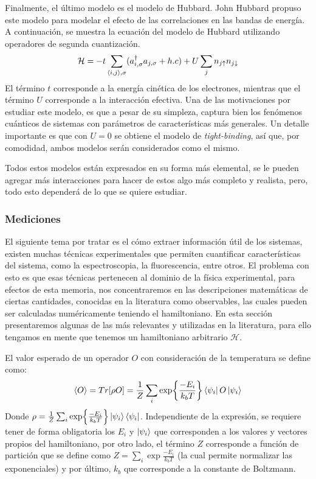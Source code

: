 Finalmente, el último modelo es el modelo de Hubbard\cite{HubbardModel}. John Hubbard propuso este modelo para modelar el efecto de las correlaciones en las bandas de energía. A continuación, se muestra la ecuación del modelo de Hubbard utilizando operadores de segunda cuantización.
\begin{equation}
    \mathcal{H} = -t \sum_{\expval{i,j}, \sigma}( a^{\dag}_{i, \sigma} a_{j, \sigma} + h.c) + U\sum_{j}n_{j\uparrow}n_{j\downarrow}
    \label{eq:FHHamiltonian}
\end{equation}
El término $t$ corresponde a la energía cinética de los electrones, mientras que el término $U$ corresponde a la interacción efectiva. Una de las motivaciones por estudiar este modelo, es que a pesar de su simpleza, captura bien los fenómenos cuánticos de sistemas con parámetros de características más generales\cite{HubbardModelBook}. Un detalle importante es que con $U = 0$ se obtiene el modelo de \textit{tight-binding}, así que, por comodidad, ambos modelos serán considerados como el mismo.


Todos estos modelos están expresados en su forma más elemental, se le pueden agregar más interacciones para hacer de estos algo más completo y realista, pero, todo esto dependerá de lo que se quiere estudiar.


\subsubsection{Mediciones}

El siguiente tema por tratar es el cómo extraer información útil de los sistemas, existen muchas técnicas experimentales que permiten cuantificar características del sistema, como la espectroscopia, la fluorescencia, entre otros. El problema con esto es que esas técnicas pertenecen al dominio de la física experimental, para efectos de esta memoria, nos concentraremos en las descripciones matemáticas de ciertas cantidades, conocidas en la literatura como observables, las cuales pueden ser calculadas numéricamente teniendo el hamiltoniano. En esta sección presentaremos algunas de las más relevantes y utilizadas en la literatura, para ello tengamos en mente que tenemos un hamiltoniano arbitrario $\mathcal{H}$.

El valor esperado de un operador $O$ con consideración de la temperatura se define como:
\begin{equation*}
    \expval{O} = Tr[\rho O] = \frac{1}{Z}\sum_i \exp{\frac{-E_i}{k_bT}}\bra{\psi_i}O\ket{\psi_i}
\end{equation*}
Donde $\rho = \frac{1}{Z}\sum_i \exp{\frac{-E_i}{k_bT}}\ket{\psi_i}\bra{\psi_i}$. Independiente de la expresión, se requiere tener de forma obligatoria los $E_i$ y $\ket{\psi_i}$ que corresponden a los valores y vectores propios del hamiltoniano, por otro lado, el término $Z$ corresponde a función de partición que se define como $Z = \sum_i \exp{\frac{-E_i}{k_bT}}$ (la cual permite normalizar las exponenciales) y por último, $k_b$ que corresponde a la constante de Boltzmann.

